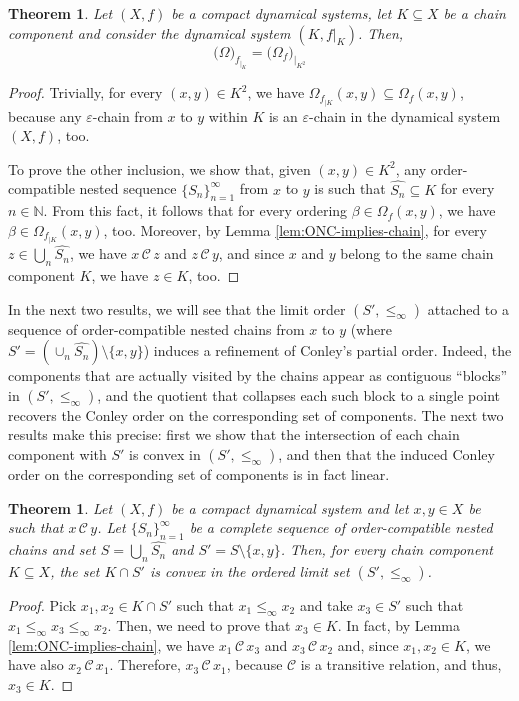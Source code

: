\documentclass[10pt,a4paper]{article}
\theoremstyle{definition}
\theoremstyle{remark}
\theoremstyle{plain}
\newtheorem{thm}[defi]{Theorem}
\begin{document}
\begin{thm}
    Let $(X,f)$ be a compact dynamical systems, let $K\subseteq X$ be a chain component and consider the dynamical system $(K,f|_{K})$. Then,
    $$\big(\Omega\big)_{f_{|_K}}=\big(\Omega_{f}\big)_{|_{K^2}}$$
\end{thm}
\begin{proof}
    Trivially, for every $(x,y)\in K^2$, we have $\Omega_{f_{|K}}(x,y)\subseteq\Omega_f(x,y)$, because any $\varepsilon$-chain from $x$ to $y$ within $K$ is an $\varepsilon$-chain in the dynamical system $(X,f)$, too.
    
    To prove the other inclusion,
    we show that, given $(x,y)\in K^2$, any order-compatible nested sequence $\{S_n\}_{n=1}^\infty$ from $x$ to $y$ is such that $\widehat{S_n}\subseteq K$ for every $n\in\mathbb N$. From this fact, it follows that for every ordering $\beta\in\Omega_f(x,y)$, we have $\beta\in\Omega_{f_{|K}}(x,y)$, too. Moreover, by Lemma \ref{lem:ONC-implies-chain}, for every $z\in\bigcup_n\widehat{S_n}$, we have $x\,\mathcal{C}\,z$ and $z\,\mathcal{C}\,y$, and since $x$ and $y$ belong to the same chain component $K$, we have $z\in K$, too. 
\end{proof}


In the next two results, we will see that the limit order $(S',\leq_\infty)$ attached to a sequence of order-compatible
nested chains from $x$ to $y$ (where $S'=\left(\cup_n\widehat{S_n}\right)\setminus\{x,y\}$) induces a  refinement of Conley’s partial order.
Indeed, the components that are
actually visited by the chains appear as contiguous ``blocks'' in $(S',\le_\infty)$, and
the quotient that collapses each such block
to a single point recovers the Conley order on the corresponding set of
components.
The next two results make this precise: first we show that the intersection of
each chain component with $S'$ is convex in $(S',\le_\infty)$, and then that the
induced Conley order on the corresponding set of components is in fact linear.

 \begin{thm}\label{convex_}
    Let $(X,f)$ be a compact dynamical system and let $x,y\in X$ be such that $x\,\mathcal{C}\,y$. Let $\{S_n\}_{n=1}^\infty$ be a complete sequence of order-compatible nested chains and set $S=\bigcup_n\widehat{S_n}$ and $S'=S\setminus\{x,y\}$. Then, for every chain component $K\subseteq X$, the set $K\cap S'$ is convex in the ordered limit set $(S',\le_\infty)$.
\end{thm}
\begin{proof}
    Pick $x_1,x_2\in K\cap S'$ such that $x_1\le_\infty x_2$ and take $x_3\in S'$ such that $x_1\le_\infty x_3\le_\infty x_2$. Then, we need to prove that $x_3\in K$. In fact, by Lemma \ref{lem:ONC-implies-chain}, we have $x_1\,\mathcal{C}\,x_3$  and $x_3\,\mathcal{C}\,x_2$ and, since $x_1,x_2\in K$, we have also $x_2\,\mathcal{C}\,x_1$. Therefore, $x_3\,\mathcal{C}\,x_1$, because $\mathcal{C}$ is a transitive relation, and thus, $x_3\in K$.
\end{proof}
\end{document}
